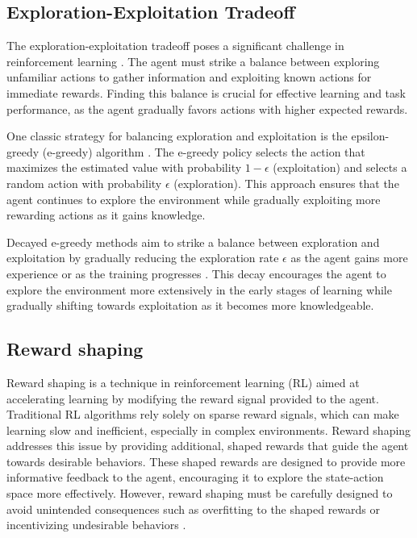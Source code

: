 \subsection{Exploration-Exploitation Tradeoff}

The exploration-exploitation tradeoff poses a significant challenge in reinforcement learning \cite{sutton2018reinforcement}. The agent must strike a balance between exploring unfamiliar actions to gather information and exploiting known actions for immediate rewards. Finding this balance is crucial for effective learning and task performance, as the agent gradually favors actions with higher expected rewards.

One classic strategy for balancing exploration and exploitation is the epsilon-greedy (e-greedy) algorithm \cite{sutton2018reinforcement}. The e-greedy policy selects the action that maximizes the estimated value with probability $1 - \epsilon$ (exploitation) and selects a random action with probability $\epsilon$ (exploration). This approach ensures that the agent continues to explore the environment while gradually exploiting more rewarding actions as it gains knowledge.

Decayed e-greedy methods aim to strike a balance between exploration and exploitation by gradually reducing the exploration rate $\epsilon$ as the agent gains more experience or as the training progresses \cite{sutton2018reinforcement}. This decay encourages the agent to explore the environment more extensively in the early stages of learning while gradually shifting towards exploitation as it becomes more knowledgeable.

\subsection{Reward shaping}

Reward shaping is a technique in reinforcement learning (RL) aimed at accelerating learning by modifying the reward signal provided to the agent. Traditional RL algorithms rely solely on sparse reward signals, which can make learning slow and inefficient, especially in complex environments. Reward shaping addresses this issue by providing additional, shaped rewards that guide the agent towards desirable behaviors. These shaped rewards are designed to provide more informative feedback to the agent, encouraging it to explore the state-action space more effectively. However, reward shaping must be carefully designed to avoid unintended consequences such as overfitting to the shaped rewards or incentivizing undesirable behaviors \cite{russel2020ai}.

